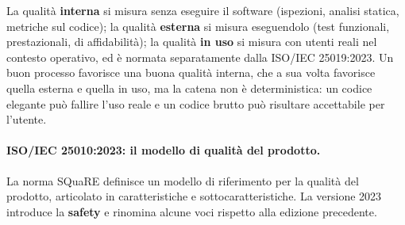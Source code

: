 \documentclass[12pt]{extarticle}
\begin{document}
\begin{center}
\end{center}

\noindent La qualità \textbf{interna} si misura senza eseguire il software (ispezioni, analisi statica, metriche sul codice); la qualità \textbf{esterna} si misura eseguendolo (test funzionali, prestazionali, di affidabilità); la qualità \textbf{in uso} si misura con utenti reali nel contesto operativo, ed è normata separatamente dalla ISO/IEC 25019:2023. Un buon processo favorisce una buona qualità interna, che a sua volta favorisce quella esterna e quella in uso, ma la catena non è deterministica: un codice elegante può fallire l'uso reale e un codice brutto può risultare accettabile per l'utente.

\paragraph{ISO/IEC 25010:2023: il modello di qualità del prodotto.}
La norma SQuaRE definisce un modello di riferimento per la qualità del prodotto, articolato in caratteristiche e sottocaratteristiche. La versione 2023 introduce la \textbf{safety} e rinomina alcune voci rispetto alla edizione precedente.
\end{document}
